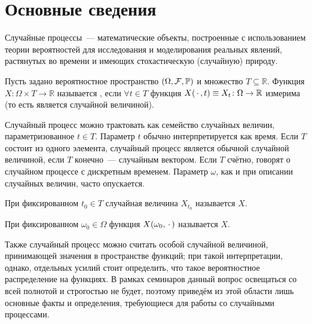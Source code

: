 \section{Основные сведения} \label{section:basics}

Случайные процессы~--- математические объекты,
построенные с использованием теории вероятностей для исследования и моделирования реальных явлений,
растянутых во времени и имеющих стохастическую (случайную) природу.

\begin{definition}
    \label{definition:basics:stochastic_process}
    Пусть задано вероятностное пространство $ (\Omega, \mathcal{F}, \mathbb{P}) $ и множество $ T \subseteq \mathbb{R} $.
    Функция $ X\colon \Omega \times T \to \mathbb{R} $ называется ,
    если $ \forall t \in T $ функция $ X(\, \cdot \,, t) \equiv X_t\colon \Omega \to \mathbb{R} $ измерима
    (то есть является случайной величиной).
\end{definition}

Случайный процесс можно трактовать как семейство случайных величин, параметризованное $ t \in T $.
Параметр $ t $ обычно интерпретируется как время.
Если $ T $ состоит из одного элемента, случайный процесс является обычной случайной величиной,
если $ T $ конечно~--- случайным вектором.
Если $ T $ счётно, говорят о случайном процессе с дискретным временем.
Параметр $ \omega $, как и при описании случайных величин, часто опускается.

\begin{definition}
    \label{definition:basics:stochastic_process_slice}
    При фиксированном $ t_0 \in T $ случайная величина $ X_{t_0} $ называется  $ X $.
\end{definition}

\begin{definition}
    \label{definition:basics:stochastic_process_realization}
    При фиксированном $ \omega_0 \in \Omega $ функция $ X(\omega_0, \, \cdot \,) $ называется  $ X $.
\end{definition}

Также случайный процесс можно считать особой случайной величиной, принимающей значения в пространстве функций;
при такой интерпретации, однако, отдельных усилий стоит определить, что такое вероятностное распределение на функциях.
В рамках семинаров данный вопрос освещаться со всей полнотой и строгостью не будет,
поэтому приведём из этой области лишь основные факты и определения,
требующиеся для работы со случайными процессами.

